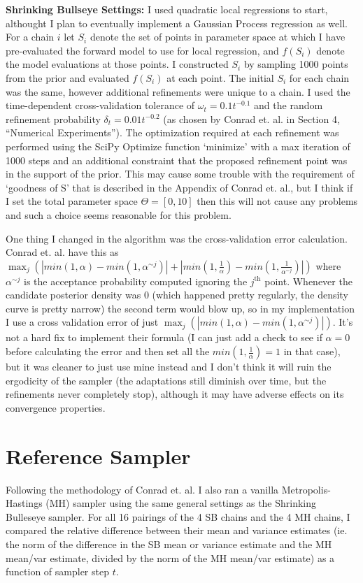 \documentclass[12pt,a4paper]{article}
\begin{document}
\textbf{Shrinking Bullseye Settings: } I used quadratic local regressions to start, althought I plan to eventually implement a Gaussian Process regression as well.  For a chain $i$ let $S_i$ denote the set of points in parameter space at which I have pre-evaluated the forward model to use for local regression, and $f(S_i)$ denote the model evaluations at those points.  I constructed $S_i$ by sampling 1000 points from the prior and evaluated $f(S_i)$ at each point.  The initial $S_i$ for each chain was the same, however additional refinements were unique to a chain.  I used the time-dependent cross-validation tolerance of $\omega_t = 0.1t^{-0.1}$ and the random refinement probability $\delta_t = 0.01 t^{-0.2}$ (as chosen by Conrad et. al. in Section 4, ``Numerical Experiments'').  The optimization required at each refinement was performed using the SciPy Optimize function `minimize' with a max iteration of 1000 steps and an additional constraint that the proposed refinement point was in the support of the prior.  This may cause some trouble with the requirement of `goodness of S' that is described in the Appendix of Conrad et. al., but I think if I set the total parameter space $\Theta = [0,10]$ then this will not cause any problems and such a choice seems reasonable for this problem.

One thing I changed in the algorithm was the cross-validation error calculation.  Conrad et. al. have this as $\max_j \left( |min(1,\alpha) - min(1,\alpha^{\sim j})| + |min(1,\frac{1}{\alpha}) - min(1,\frac{1}{\alpha^{\sim j}})| \right)$ where $\alpha^{\sim j}$ is the acceptance probability computed ignoring the $j^{\text{th}}$ point.  Whenever the candidate posterior density was $0$ (which happened pretty regularly, the density curve is pretty narrow) the second term would blow up, so in my implementation I use a cross validation error of just $\max_j \left( |min(1,\alpha) - min(1,\alpha^{\sim j})| \right)$.  It's not a hard fix to implement their formula (I can just add a check to see if $\alpha = 0$ before calculating the error and then set all the $min(1,\frac{1}{\alpha}) = 1$ in that case), but it was cleaner to just use mine instead and I don't think it will ruin the ergodicity of the sampler (the adaptations still diminish over time, but the refinements never completely stop), although it may have adverse effects on its convergence properties. 

\section{Reference Sampler}
Following the methodology of Conrad et. al. I also ran a vanilla Metropolis-Hastings (MH) sampler using the same general settings as the Shrinking Bulleseye sampler.  For all 16 pairings of the 4 SB chains and the 4 MH chains, I compared the relative difference between their mean and variance estimates (ie. the norm of the difference in the SB mean or variance estimate and the MH mean/var estimate, divided by the norm of the MH mean/var estimate) as a function of sampler step $t$.
\end{document}
